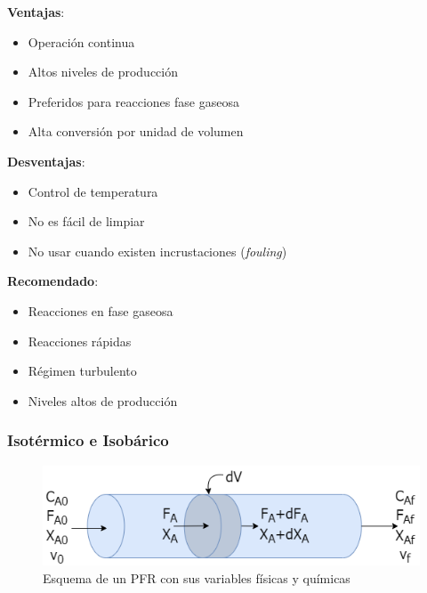     \begin{multicols}{2}
        \textbf{Ventajas}:
        
        \begin{itemize}
            \item Operación continua
            \item Altos niveles de producción
            \item Preferidos para reacciones fase gaseosa
            \item Alta conversión por unidad de volumen
        \end{itemize}
        
        \textbf{Desventajas}:
        
        \begin{itemize}
            \item Control de temperatura
            \item No es fácil de limpiar
            \item No usar cuando existen incrustaciones (\textit{fouling})
        \end{itemize}
    \end{multicols}
    
    \textbf{Recomendado}:
    \begin{multicols}{2}
        \begin{itemize}
            \item Reacciones en fase gaseosa
            \item Reacciones rápidas
            \item Régimen turbulento
            \item Niveles altos de producción
        \end{itemize}
    \end{multicols}
    
        \subsubsection{Isotérmico e Isobárico}
        
        \begin{figure}
            \centering
            \includegraphics[width=.6\textwidth]{img/diagramas/esquema_pfr_variables.png}
            \caption{Esquema de un PFR con sus variables físicas y químicas}
            \label{fig:esquema_pfr_variables}
        \end{figure}
        
